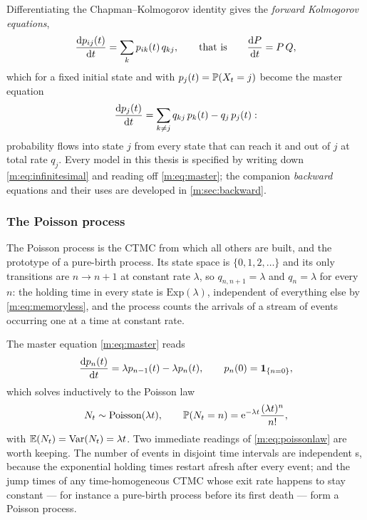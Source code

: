 Differentiating the Chapman--Kolmogorov identity gives the \emph{forward
Kolmogorov equations},
\begin{equation}
\label{m:eq:kolmogorov}
\frac{\mathrm{d} p_{ij}(t)}{\mathrm{d} t} = \sum_{k} p_{ik}(t)\,q_{kj},
\qquad\text{that is}\qquad
\frac{\mathrm{d} P}{\mathrm{d} t} = P\,Q ,
\end{equation}
which for a fixed initial state and with $p_j(t)=\mathbb{P}\!\left(X_t=j\right)$ become the master
equation
\begin{equation}
\label{m:eq:master}
\frac{\mathrm{d} p_j(t)}{\mathrm{d} t} = \sum_{k\neq j}q_{kj}\,p_k(t) - q_j\,p_j(t):
\end{equation}
probability flows into state $j$ from every state that can reach it and out of
$j$ at total rate $q_j$. Every model in this thesis is specified by writing down
\cref{m:eq:infinitesimal} and reading off \cref{m:eq:master}; the companion
\emph{backward} equations and their uses are developed in
\cref{m:sec:backward}.

\subsubsection{The Poisson process}
\label{m:sec:poisson}

The Poisson process is the CTMC from which all others are built, and the
prototype of a pure-birth process. Its state space is $\{0,1,2,\dots\}$ and its
only transitions are $n\to n+1$ at constant rate $\lambda$, so
$q_{n,n+1}=\lambda$ and $q_n=\lambda$ for every $n$: the holding time in every
state is $\mathrm{Exp}(\lambda)$, independent of everything else by
\cref{m:eq:memoryless}, and the process counts the arrivals of a stream of
events occurring one at a time at constant rate.

The master equation \cref{m:eq:master} reads
\begin{equation*}
\frac{\mathrm{d} p_n(t)}{\mathrm{d} t} = \lambda p_{n-1}(t) - \lambda p_n(t),
\qquad
p_n(0) = \mathbf{1}_{\{n=0\}},
\end{equation*}
which solves inductively to the Poisson law
\begin{equation}
\label{m:eq:poissonlaw}
N_t \sim \mathrm{Poisson}(\lambda t),
\qquad
\mathbb{P}\!\left(N_t = n\right) = \mathrm{e}^{-\lambda t}\frac{(\lambda t)^n}{n!},
\end{equation}
with $\mathbb{E}\!\left(N_t\right)=\operatorname{Var}\!\left(N_t\right)=\lambda t$. Two immediate readings of
\cref{m:eq:poissonlaw} are worth keeping. The number of events in disjoint time
intervals are independent \rv s, because the exponential holding times restart
afresh after every event; and the jump times of any time-homogeneous CTMC whose
exit rate happens to stay constant --- for instance a pure-birth process before
its first death --- form a Poisson process.


